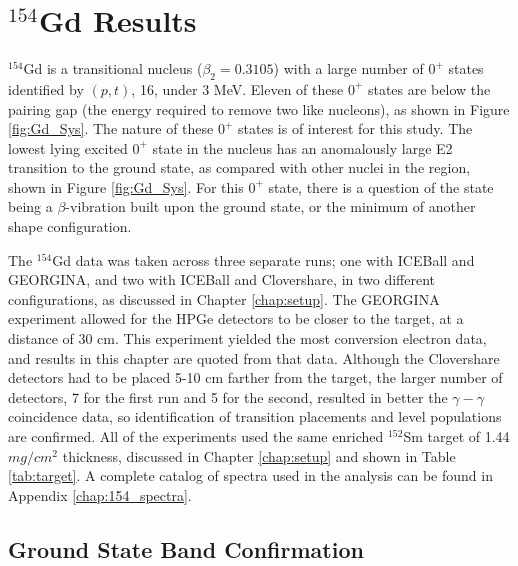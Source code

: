 \chapter{$^{154}$Gd Results}
\label{chap:154Gd}

$^{154}$Gd is a transitional nucleus ($\beta_2=0.3105$) with a large number of $0^+$ states identified by $(p,t)$, 16, under 3 MeV\citep{meyer06:_zeroplus}. Eleven of these $0^+$ states are below the pairing gap (the energy required to remove two like nucleons), as shown in Figure \ref{fig:Gd_Sys}. The nature of these $0^+$ states is of interest for this study. The lowest lying excited $0^+$ state in the nucleus has an anomalously large E2 transition to the ground state, as compared with other nuclei in the region, shown in Figure \ref{fig:Gd_Sys}. For this $0^+$ state, there is a question of the state being a $\beta$-vibration built upon the ground state, or the minimum of another shape configuration.

\afterpage{\clearpage}

The $^{154}$Gd data was taken across three separate runs; one with ICEBall and GEORGINA, and two with ICEBall and Clovershare, in two different configurations, as discussed in Chapter \ref{chap:setup}. The GEORGINA experiment allowed for the HPGe detectors to be closer to the target, at a distance of 30 cm. This experiment yielded the most conversion electron data, and results in this chapter are quoted from that data. Although the Clovershare detectors had to be placed 5-10 cm farther from the target, the larger number of detectors, 7 for the first run and 5 for the second, resulted in better the $\gamma-\gamma$ coincidence data, so identification of transition placements and level populations are confirmed. All of the experiments used the same enriched $^{152}$Sm target of 1.44 $mg/cm^2$ thickness, discussed in Chapter \ref{chap:setup} and shown in Table \ref{tab:target}. A complete catalog of spectra used in the analysis can be found in Appendix \ref{chap:154_spectra}.

\section{Ground State Band Confirmation}
\label{sec:154GS_Confirm}


